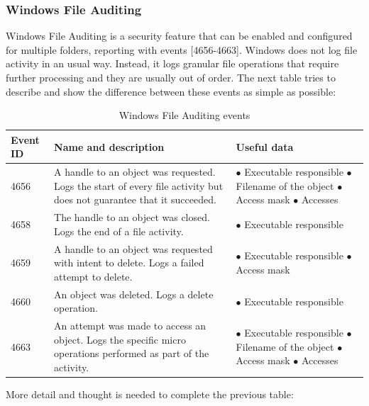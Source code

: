 \subsubsection{Windows File Auditing}
Windows File Auditing is a security feature that can be enabled and configured for multiple folders, reporting with events [4656-4663].
\linej
Windows does not log file activity in an usual way.
Instead, it logs granular file operations that require further processing and they are usually out of order.
The next table tries to describe and show the difference between these events as simple as possible\cite{windows_events}\cite{events_46_56_X}:
\begin{table}[H]
	\begin{tabularx}{\textwidth}{|l|X|X|}
		\hline
		\rowcolor{gray!30}
		Event ID & Name and description & Useful data\\ \hline
		4656& A handle to an object was requested. Logs the start of every file activity but does not guarantee that it succeeded.&
			$\bullet$ Executable responsible
			\linej $\bullet$ Filename of the object
			\linej $\bullet$ Access mask
			\linej $\bullet$ Accesses
			\\ \hline
		4658& The handle to an object was closed. Logs the end of a file activity.&
			$\bullet$ Executable responsible
			\\ \hline
		4659& A handle to an object was requested with intent to delete. Logs a failed attempt to delete.&
			$\bullet$ Executable responsible
			\linej $\bullet$ Access mask
			\\ \hline
		4660& An object was deleted. Logs a delete operation.&
			$\bullet$ Executable responsible
			\\ \hline
		4663& An attempt was made to access an object. Logs the specific micro operations performed as part of the activity.&
			$\bullet$ Executable responsible
			\linej $\bullet$ Filename of the object
			\linej $\bullet$ Access mask
			\linej $\bullet$ Accesses
			\\ \hline
	\end{tabularx}
	\caption{Windows File Auditing events}
\end{table}
\linej
More detail and thought is needed to complete the previous table\cite{windows_events}\cite{events_46_56_X}:
